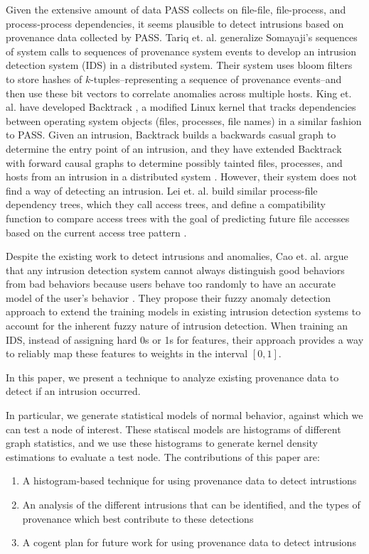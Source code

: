 \documentclass[10pt,twocolumn]{article}
\begin{document}
Given the extensive amount of data PASS collects on file-file, file-process, and process-process dependencies, it seems plausible to detect intrusions based on provenance data collected by PASS. Tariq et. al. generalize Somayaji's sequences of system calls to sequences of provenance system events \cite{correlated-anomalies} to develop an intrusion detection system (IDS) in a distributed system. Their system uses bloom filters to store hashes of $k$-tuples--representing a sequence of provenance events--and then use these bit vectors to correlate anomalies across multiple hosts. King et. al. have developed Backtrack \cite{backtrack}, a modified Linux kernel that tracks dependencies between operating system objects (files, processes, file names) in a similar fashion to PASS. Given an intrusion, Backtrack builds a backwards casual graph to determine the entry point of an intrusion, and they have extended Backtrack with forward causal graphs to determine possibly tainted files, processes, and hosts from an intrusion in a distributed system \cite{multihost}. However, their system does not find a way of detecting an intrusion. Lei et. al. build similar process-file dependency trees, which they call access trees, and define a compatibility function to compare access trees with the goal of predicting future file accesses based on the current access tree pattern \cite{fileprefetch}.

Despite the existing work to detect intrusions and anomalies, Cao et. al. argue that any intrusion detection system cannot always distinguish good behaviors from bad behaviors because users behave too randomly to have an accurate model of the user's behavior \cite{fuzzy}. They propose their fuzzy anomaly detection approach to extend the training models in existing intrusion detection systems to account for the inherent fuzzy nature of intrusion detection. When training an IDS, instead of assigning hard 0s or 1s for features, their approach provides a way to reliably map these features to weights in the interval $[0,1]$. 

In this paper, we present a technique to analyze existing provenance data to detect if an intrusion occurred. 

In particular, we generate statistical models of normal behavior, against which we can test a node of interest. These statiscal models are histograms of different graph statistics, and we use these histograms to generate kernel density estimations to evaluate a test node. The contributions of this paper are:
\begin{enumerate}
\item A histogram-based technique for using provenance data to detect intrustions
\item An analysis of the different intrusions that can be identified, and the types of provenance which best contribute to these detections
\item A cogent plan for future work for using provenance data to detect intrusions
\end{enumerate}
\end{document}
